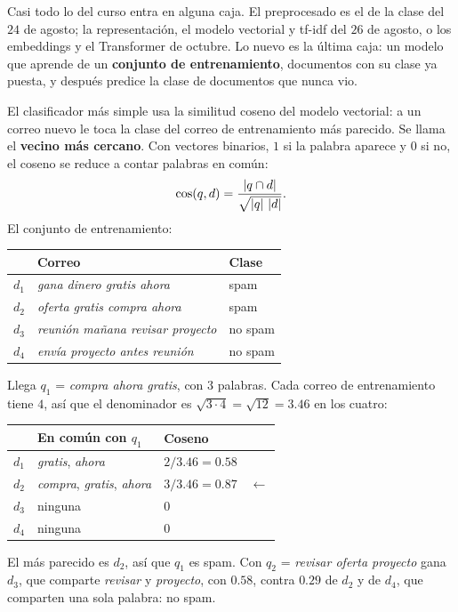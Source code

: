 \documentclass[11pt,letterpaper]{article}
\begin{document}
Casi todo lo del curso entra en alguna caja. El preprocesado es el de
la clase del $24$ de agosto; la representación, el modelo vectorial y
tf-idf del $26$ de agosto, o los embeddings y el Transformer de
octubre. Lo nuevo es la última caja: un modelo que aprende de un
\textbf{conjunto de entrenamiento}, documentos con su clase ya
puesta, y después predice la clase de documentos que nunca vio.

\begin{ejemplo}
    El clasificador más simple usa la similitud coseno del modelo
    vectorial: a un correo nuevo le toca la clase del correo de
    entrenamiento más parecido. Se llama el \textbf{vecino más
    cercano}. Con vectores binarios, $1$ si la palabra aparece y $0$
    si no, el coseno se reduce a contar palabras en común:
    \[
        \cos(q, d) = \frac{\left\lvert q \cap d \right\rvert}{\sqrt{\left\lvert q \right\rvert\,\left\lvert d \right\rvert}} .
    \]
    El conjunto de entrenamiento:
    \begin{center}
    \small
    \begin{tabular}{cll}
        \toprule
        & \textbf{Correo} & \textbf{Clase} \\
        \midrule
        $d_1$ & \textit{gana dinero gratis ahora}      & spam \\
        $d_2$ & \textit{oferta gratis compra ahora}    & spam \\
        $d_3$ & \textit{reunión mañana revisar proyecto} & no spam \\
        $d_4$ & \textit{envía proyecto antes reunión}  & no spam \\
        \bottomrule
    \end{tabular}
    \end{center}
    Llega $q_1$ = \textit{compra ahora gratis}, con $3$ palabras. Cada
    correo de entrenamiento tiene $4$, así que el denominador es
    $\sqrt{3 \cdot 4} = \sqrt{12} = 3.46$ en los cuatro:
    \begin{center}
    \small
    \begin{tabular}{cllc}
        \toprule
        & \textbf{En común con $q_1$} & \textbf{Coseno} & \\
        \midrule
        $d_1$ & \textit{gratis}, \textit{ahora}
              & $2 / 3.46 = 0.58$ & \\
        $d_2$ & \textit{compra}, \textit{gratis}, \textit{ahora}
              & $3 / 3.46 = 0.87$ & $\leftarrow$ \\
        $d_3$ & ninguna & $0$ & \\
        $d_4$ & ninguna & $0$ & \\
        \bottomrule
    \end{tabular}
    \end{center}
    El más parecido es $d_2$, así que $q_1$ es spam. Con
    $q_2$ = \textit{revisar oferta proyecto} gana $d_3$, que comparte
    \textit{revisar} y \textit{proyecto}, con $0.58$, contra $0.29$ de
    $d_2$ y de $d_4$, que comparten una sola palabra: no spam.
\end{ejemplo}
\end{document}
